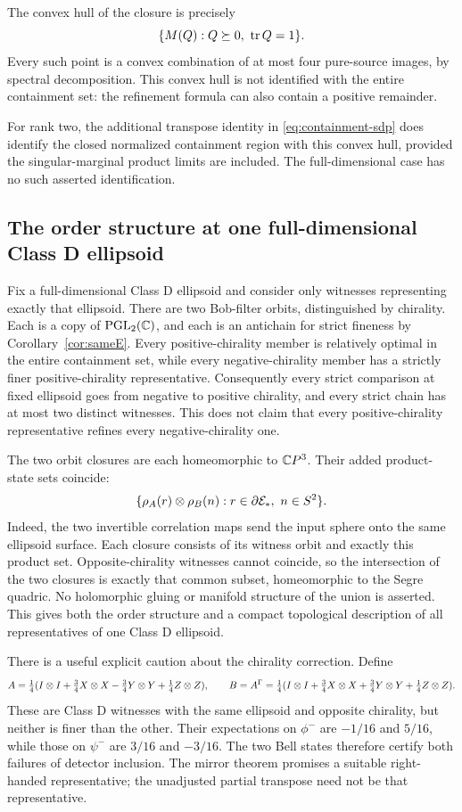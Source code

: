 The convex hull of the closure is precisely
\[
 \{M(Q):Q\succeq0,\ \operatorname{tr} Q=1\}.
\]
Every such point is a convex combination of at most four pure-source images, by spectral decomposition. This convex hull is not identified with the entire containment set: the refinement formula can also contain a positive remainder.

For rank two, the additional transpose identity in \eqref{eq:containment-sdp} does identify the closed normalized containment region with this convex hull, provided the singular-marginal product limits are included. The full-dimensional case has no such asserted identification.

\subsection{The order structure at one full-dimensional Class D ellipsoid}

Fix a full-dimensional Class D ellipsoid and consider only witnesses representing exactly that ellipsoid. There are two Bob-filter orbits, distinguished by chirality. Each is a copy of $\operatorname{PGL}_2(\mathbb C)$, and each is an antichain for strict fineness by Corollary~\ref{cor:sameE}. Every positive-chirality member is relatively optimal in the entire containment set, while every negative-chirality member has a strictly finer positive-chirality representative. Consequently every strict comparison at fixed ellipsoid goes from negative to positive chirality, and every strict chain has at most two distinct witnesses. This does not claim that every positive-chirality representative refines every negative-chirality one.

The two orbit closures are each homeomorphic to $\mathbb C P^3$. Their added product-state sets coincide:
\[
 \{\rho_A(r)\otimes\rho_B(n):r\in\partial\E_*,\ n\in S^2\}.
\]
Indeed, the two invertible correlation maps send the input sphere onto the same ellipsoid surface. Each closure consists of its witness orbit and exactly this product set. Opposite-chirality witnesses cannot coincide, so the intersection of the two closures is exactly that common subset, homeomorphic to the Segre quadric. No holomorphic gluing or manifold structure of the union is asserted. This gives both the order structure and a compact topological description of all representatives of one Class D ellipsoid.

There is a useful explicit caution about the chirality correction. Define
\[
 A=\tfrac14(I\otimes I+\tfrac34X\otimes X-\tfrac34Y\otimes Y+\tfrac14Z\otimes Z),
 \qquad B=A^\Gamma=\tfrac14(I\otimes I+\tfrac34X\otimes X+\tfrac34Y\otimes Y+\tfrac14Z\otimes Z).
\]
These are Class D witnesses with the same ellipsoid and opposite chirality, but neither is finer than the other. Their expectations on $\phi^-$ are $-1/16$ and $5/16$, while those on $\psi^-$ are $3/16$ and $-3/16$. The two Bell states therefore certify both failures of detector inclusion. The mirror theorem promises a suitable right-handed representative; the unadjusted partial transpose need not be that representative.

